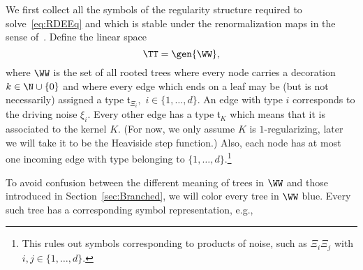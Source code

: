 \documentclass{article}
\begin{document}
We first collect all the symbols of the regularity structure required to solve~\eqref{eq:RDEEq} and which is stable under the renormalization maps in the sense of~\cite{BHZ16}.
Define the linear space $$\TT = \gen{\WW},$$
where $\WW$ is the set of all rooted trees where every node carries a decoration $k \in \N \cup \{0\}$ and where every edge which ends on a leaf may be (but is not necessarily) assigned a type $ \mathfrak{t}_{\Xi_i}, $ $i \in \{1,\ldots, d\}$. An edge with type $ i $ corresponds to the driving noise $ \xi_i $. Every other edge has a type $ \mathfrak{t}_{K} $ which means that it is associated to the kernel $ K $. (For now, we only assume $K$ is $1$-regularizing, later we will take it to be the Heaviside step function.) Also, each node has at most one incoming edge with type belonging to $  \{1,\ldots, d\}$.\footnote{This rules out symbols corresponding to products of noise, such as $\Xi_i \Xi_j$ with $i,j \in   \{1,\ldots, d\}$.}

To avoid confusion between the different meaning of trees in $\WW$ and those introduced in Section~\ref{sec:Branched}, we will color every tree in $\WW$ blue. Every such tree has a corresponding symbol representation, e.g.,

\end{document}
